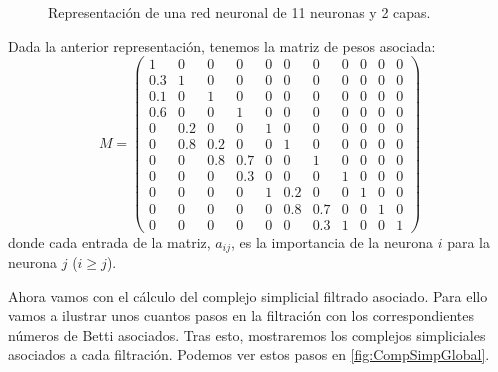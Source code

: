 \documentclass[12pt, a4paper, twoside]{book}
\numberwithin{equation}{section}
\theoremstyle{definition}
\newenvironment{ejem}
  {\pushQED{\qed}\renewcommand{\qedsymbol}{$\blacktriangleleft$}\ejemplo}
  {\popQED\endejemplo}
\theoremstyle{remark}
\theoremstyle{plain}
\begin{document}
\begin{ejem}
\begin{figure}[!htbp]
				\caption{Representación de una red neuronal de 11 neuronas y 2 capas.}
				\label{fig:ejemGlobal}
		\end{figure}
		Dada la anterior representación, tenemos la matriz de pesos 
		asociada:
		\begin{equation*}
			M=\begin{pmatrix}
				1 & 0 & 0 & 0 & 0 & 0 & 0 & 0 & 0 & 0 & 0 \\
				0.3 & 1 & 0 & 0 & 0 & 0 & 0 & 0 & 0 & 0 & 0 \\
				0.1 & 0 & 1 & 0 & 0 & 0 & 0 & 0 & 0 & 0 & 0 \\
				0.6 & 0 & 0 & 1 & 0 & 0 & 0 & 0 & 0 & 0 & 0 \\
				0 & 0.2 & 0 & 0 & 1 & 0 & 0 & 0 & 0 & 0 & 0 \\
				0 & 0.8 & 0.2 & 0 & 0 & 1 & 0 & 0 & 0 & 0 & 0 \\
				0 & 0 & 0.8 & 0.7 & 0 & 0 & 1 & 0 & 0 & 0 & 0 \\
				0 & 0 & 0 & 0.3 & 0 & 0 & 0 & 1 & 0 & 0 & 0 \\
				0 & 0 & 0 & 0 & 1 & 0.2 & 0 & 0 & 1 & 0 & 0 \\
				0 & 0 & 0 & 0 & 0 & 0.8 & 0.7 & 0 & 0 & 1 & 0 \\
				0 & 0 & 0 & 0 & 0 & 0 & 0.3 & 1 & 0 & 0 & 1 
			\end{pmatrix}
		\end{equation*}
		donde cada entrada de la matriz, $a_{ij}$, es la importancia 
		de la neurona $i$ para la neurona $j$ ($i \geq j$).

		Ahora vamos con el cálculo del complejo simplicial filtrado 
		asociado. Para ello vamos a ilustrar unos cuantos pasos en la 
		filtración con los correspondientes números de Betti 
		asociados. Tras esto, mostraremos los complejos
		simpliciales asociados a cada filtración. Podemos ver estos 
		pasos en \autoref{fig:CompSimpGlobal}.


\end{ejem}
\end{document}
